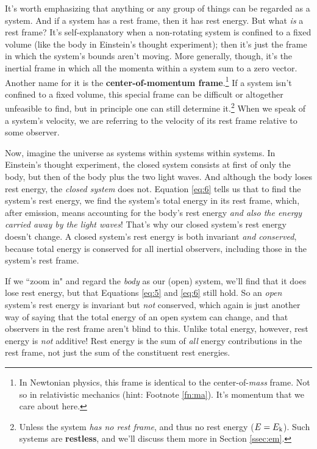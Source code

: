 \documentclass[12pt]{article}
\begin{document}
It's worth emphasizing that anything or any group of things can be regarded as a system. And if a system has a rest frame, then it has rest energy. But what \emph{is} a rest frame? It's self-explanatory when a non-rotating system is confined to a fixed volume (like the body in Einstein's thought experiment); then it's just the frame in which the system's bounds aren't moving. More generally, though, it's the inertial frame in which all the momenta within a system sum to a zero vector. Another name for it is the \textbf{center-of-momentum frame}.\footnote{In Newtonian physics, this frame is identical to the center-of-\emph{mass} frame. Not so in relativistic mechanics (hint: Footnote \ref{fn:ma}). It's momentum that we care about here.} If a system isn't confined to a fixed volume, this special frame can be difficult or altogether unfeasible to find, but in principle one can still determine it.\footnote{\label{fn:rl}Unless the system \emph{has no rest frame}, and thus no rest energy ($E = E_{\mkern.5mu \textrm{k}}$). Such systems are \textbf{restless}, and we'll discuss them more in Section \ref{ssec:em}.} When we speak of a system's velocity, we are referring to the velocity of its rest frame relative to some observer.

Now, imagine the universe as systems within systems within systems. In Einstein's thought experiment, the closed system consists at first of only the body, but then of the body plus the two light waves. And although the body loses rest energy, the \emph{closed system} does not. Equation \ref{eq:6} tells us that to find the system's rest energy, we find the system's total energy in its rest frame, which, after emission, means accounting for the body's rest energy \emph{and also the energy carried away by the light waves}! That's why our closed system's rest energy doesn't change. A closed system's rest energy is both invariant \emph{and conserved}, because total energy is conserved for all inertial observers, including those in the system's rest frame.

If we ``zoom in" and regard the \emph{body} as our (open) system, we'll find that it does lose rest energy, but that Equations \ref{eq:5} and \ref{eq:6} still hold. So an \emph{open} system's rest energy is invariant but \emph{not} conserved, which again is just another way of saying that the total energy of an open system can change, and that observers in the rest frame aren't blind to this. Unlike total energy, however, rest energy is \emph{not} additive! Rest energy is the sum of \emph{all} energy contributions in the rest frame, not just the sum of the constituent rest energies.
\end{document}
